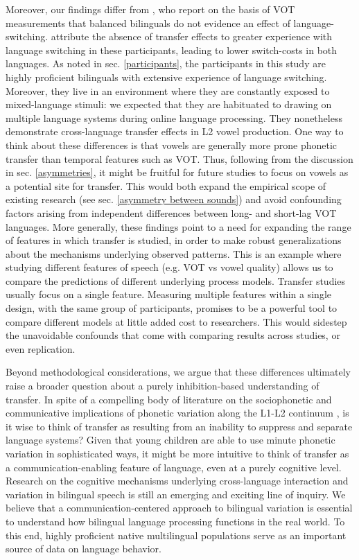 \documentclass[12 pt]{article}
\begin{document}
Moreover, our findings differ from \cite{tsui2019impact}, who report on the basis of VOT measurements that balanced bilinguals do not evidence an effect of language-switching. \citeauthor{tsui2019impact} attribute the absence of transfer effects to greater experience with language switching in these participants, leading to lower switch-costs in both languages. As noted in sec. \ref{participants}, the participants in this study are highly proficient bilinguals with extensive experience of language switching. Moreover, they live in an environment where they are constantly exposed to mixed-language stimuli: we expected that they are habituated to drawing on multiple language systems during online language processing. They nonetheless demonstrate cross-language transfer effects in L2 vowel production. One way to think about these differences is that vowels are generally more prone phonetic transfer than temporal features such as VOT. Thus, following from the discussion in sec. \ref{asymmetries}, it might be fruitful for future studies to focus on vowels as a potential site for transfer. This would both expand the empirical scope of existing research (see sec. \ref{asymmetry between sounds}) and avoid confounding factors arising from independent differences between long- and short-lag VOT languages. More generally, these findings point to a need for expanding the range of features in which transfer is studied, in order to make robust generalizations about the mechanisms underlying observed patterns. This is an example where studying different features of speech (e.g. VOT vs vowel quality) allows us to compare the predictions of different underlying process models. Transfer studies usually focus on a single feature. Measuring multiple features within a single design, with the same group of participants, promises to be a powerful tool to compare different models at little added cost to researchers. This would sidestep the unavoidable confounds that come with comparing results across studies, or even replication.

Beyond methodological considerations, we argue that these differences ultimately raise a broader question about a purely inhibition-based understanding of transfer. In spite of a compelling body of literature on the sociophonetic and communicative implications of phonetic variation along the L1-L2 continuum \citep[e.g.][]{khattab2013phonetic,agnihotri1979processes,stuart2011hybridity}, is it wise to think of transfer as resulting from an inability to suppress and separate language systems? Given that young children are able to use minute phonetic variation in sophisticated ways, it might be more intuitive to think of transfer as a communication-enabling feature of language, even at a purely cognitive level. Research on the cognitive mechanisms underlying cross-language interaction and variation in bilingual speech is still an emerging and exciting line of inquiry. We believe that a communication-centered approach to bilingual variation is essential to understand how bilingual language processing functions in the real world. To this end, highly proficient native multilingual populations serve as an important source of data on language behavior. 
\end{document}
